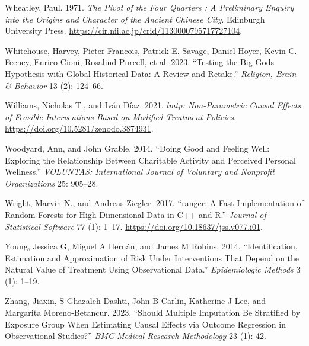 \documentclass[
  single column]{article}
\newlength{\cslhangindent}
\newenvironment{CSLReferences}[2] %
 {\begin{list}{}{%
  \setlength{\itemindent}{0pt}
  \setlength{\leftmargin}{0pt}
  \setlength{\parsep}{0pt}
  \ifodd #1
   \setlength{\leftmargin}{\cslhangindent}
   \setlength{\itemindent}{-1\cslhangindent}
  \fi
  \setlength{\itemsep}{#2\baselineskip}}}
 {\end{list}}
\begin{document}
\begin{CSLReferences}{1}{0}
Wheatley, Paul. 1971. \emph{The Pivot of the Four Quarters : A
Preliminary Enquiry into the Origins and Character of the Ancient
Chinese City}. Edinburgh University Press.
\url{https://cir.nii.ac.jp/crid/1130000795717727104}.

Whitehouse, Harvey, Pieter Francois, Patrick E. Savage, Daniel Hoyer,
Kevin C. Feeney, Enrico Cioni, Rosalind Purcell, et al. 2023. {``Testing
the Big Gods Hypothesis with Global Historical Data: A Review and
Retake.''} \emph{Religion, Brain \& Behavior} 13 (2): 124--66.

Williams, Nicholas T., and Iván Díaz. 2021. \emph{{l}mtp: Non-Parametric
Causal Effects of Feasible Interventions Based on Modified Treatment
Policies}. \url{https://doi.org/10.5281/zenodo.3874931}.

Woodyard, Ann, and John Grable. 2014. {``Doing Good and Feeling Well:
Exploring the Relationship Between Charitable Activity and Perceived
Personal Wellness.''} \emph{VOLUNTAS: International Journal of Voluntary
and Nonprofit Organizations} 25: 905--28.

Wright, Marvin N., and Andreas Ziegler. 2017. {``{ranger}: A Fast
Implementation of Random Forests for High Dimensional Data in {C++} and
{R}.''} \emph{Journal of Statistical Software} 77 (1): 1--17.
\url{https://doi.org/10.18637/jss.v077.i01}.

Young, Jessica G, Miguel A Hernán, and James M Robins. 2014.
{``Identification, Estimation and Approximation of Risk Under
Interventions That Depend on the Natural Value of Treatment Using
Observational Data.''} \emph{Epidemiologic Methods} 3 (1): 1--19.

Zhang, Jiaxin, S Ghazaleh Dashti, John B Carlin, Katherine J Lee, and
Margarita Moreno-Betancur. 2023. {``Should Multiple Imputation Be
Stratified by Exposure Group When Estimating Causal Effects via Outcome
Regression in Observational Studies?''} \emph{BMC Medical Research
Methodology} 23 (1): 42.

\end{CSLReferences}
\end{document}
